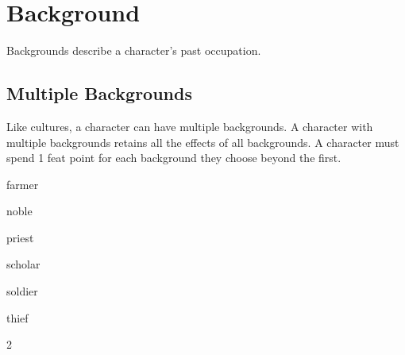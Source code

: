 \chapter{Background}\label{background}
\begin{multicols*}{2}
    Backgrounds describe a character's past occupation.

    \section{Multiple Backgrounds}
    Like cultures, a character can have multiple backgrounds. A character with
    multiple backgrounds retains all the effects of all backgrounds. A character
    must spend 1 feat point for each background they choose beyond the first.

    {farmer}

    {noble}

    {priest}

    {scholar}

    {soldier}

    {thief}
\end{multicols*}{2}
